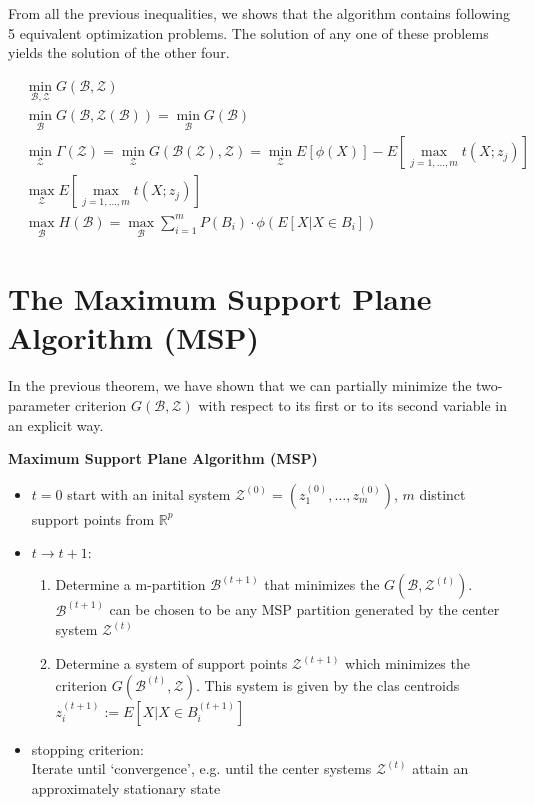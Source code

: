 \documentclass{article}
\begin{document}
From all the previous inequalities, we shows that the algorithm contains following 5 equivalent optimization problems. The solution of any one of these problems yields the solution of the other four.


\begin{align}
	&\min_{\mathcal B, \mathcal Z}G(\mathcal B, \mathcal Z)\\
	&\min_{\mathcal B} G(\mathcal B, \mathcal Z(\mathcal B)) = \min_{\mathcal B} G(\mathcal B)\\
	&\min_{\mathcal Z} \Gamma(\mathcal Z) = \min_{\mathcal Z}G(\mathcal B(\mathcal Z), \mathcal Z) = \min_{\mathcal Z} E[\phi(X)] - E[\max_{j= 1,\ldots,m}t(X;z_j)]\\
	&\max_{\mathcal Z} E[\max_{j=1,\ldots,m}t(X;z_j)]\\
	&\max_{\mathcal B} H(\mathcal B) = \max_{\mathcal B}\sum_{i=1}^m P(B_i)\cdot\phi(E[X|X\in B_i])
\end{align}


\section{The Maximum Support Plane Algorithm (MSP)}


In the previous theorem, we have shown that we can partially minimize the two-parameter criterion $G(\mathcal B, \mathcal Z)$ with respect to its first or to its second variable in an explicit way.

\textbf{Maximum Support Plane Algorithm (MSP)}
\begin{itemize}
	\item $t = 0$ start with an inital system $\mathcal Z^{(0)} = (z_1^{(0)}, \ldots, z_m^{(0)})$, $m$ distinct support points from $\mathbb R^p$
	\item $t \to t+1:$
	\begin{enumerate}[label=\roman*)]
		\item Determine a m-partition $\mathcal B^{(t+1)}$ that minimizes the $G(\mathcal B, \mathcal Z^{(t)})$. $\mathcal B^{(t+1)}$ can be chosen to be any MSP partition generated by the center system $\mathcal Z^{(t)}$
		\item Determine a system of support points $\mathcal Z^{(t+1)}$ which minimizes the criterion $G(\mathcal B^{(t)}, \mathcal Z)$. This system is given by the clas centroids $z_i^{(t+1)} := E[X|X\in B_i^{(t+1)}]$
	\end{enumerate}
	\item stopping criterion:\\ Iterate until `convergence', e.g. until the center systems $\mathcal Z^{(t)}$ attain an approximately stationary state
	
\end{itemize}
\end{document}
